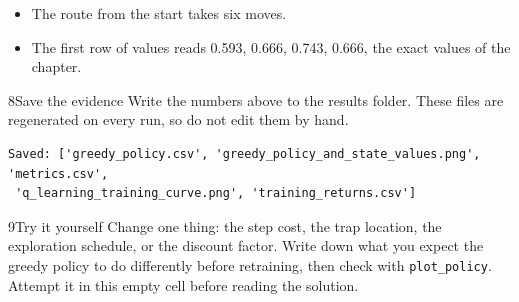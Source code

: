\begin{labcheckpoint}
\begin{itemize}[leftmargin=1.2em,itemsep=2pt,topsep=1pt]
  \item The route from the start takes six moves.
  \item The first row of values reads 0.593, 0.666, 0.743, 0.666, the exact values of the chapter.
\end{itemize}
\end{labcheckpoint}


\begin{labquestion}{8}{Save the evidence}
Write the numbers above to the results folder. These files are regenerated on every run, so do not edit them by hand.
\end{labquestion}
\begin{labanswer}

\begin{refoutput}
\begin{lstlisting}[style=utpterminal]
Saved: ['greedy_policy.csv', 'greedy_policy_and_state_values.png', 'metrics.csv',
 'q_learning_training_curve.png', 'training_returns.csv']
\end{lstlisting}
\end{refoutput}
\end{labanswer}


\begin{labquestion}{9}{Try it yourself}
Change one thing: the step cost, the trap location, the exploration schedule, or the discount factor. Write down what you expect the greedy policy to do differently before retraining, then check with \texttt{plot\_policy}. Attempt it in this empty cell before reading the solution.
\end{labquestion}

